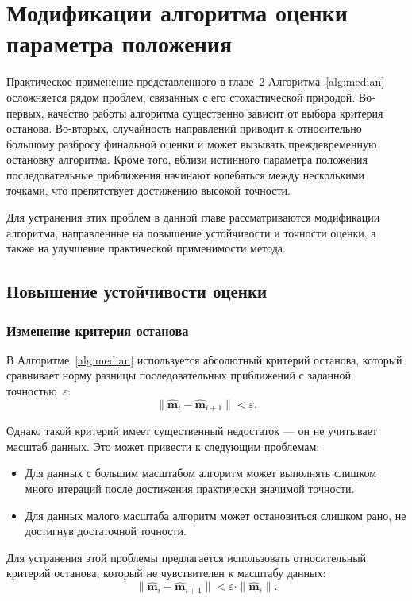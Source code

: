 \chapter{Модификации алгоритма оценки параметра положения}

Практическое применение представленного в главе~2 Алгоритма~\ref{alg:median}  осложняется рядом проблем, связанных с его стохастической природой. Во-первых, качество работы алгоритма существенно зависит от выбора критерия останова. Во-вторых, случайность направлений приводит к относительно большому разбросу финальной оценки и может вызывать преждевременную остановку алгоритма. Кроме того, вблизи истинного параметра положения последовательные приближения начинают колебаться между несколькими точками, что препятствует достижению высокой точности.

Для устранения этих проблем в данной главе рассматриваются модификации алгоритма, направленные на повышение устойчивости и точности оценки, а также на улучшение практической применимости метода.

\section{Повышение устойчивости оценки}

\subsection{Изменение критерия останова}

В Алгоритме~\ref{alg:median} используется абсолютный критерий останова, который сравнивает норму разницы последовательных приближений с заданной точностью~$\varepsilon$: 
\[ \|\widehat{\mathbf{m}}_{{i}}-\widehat{\mathbf{m}}_{{i+1}}\|<\varepsilon.\]

Однако такой критерий имеет существенный недостаток --- он не учитывает масштаб данных. Это может привести к следующим проблемам:

\begin{itemize}
    \item Для данных с большим масштабом алгоритм может выполнять слишком много итераций после достижения практически значимой точности.
    \item Для данных малого масштаба алгоритм может остановиться слишком рано, не достигнув достаточной точности.
\end{itemize}

Для устранения этой проблемы предлагается использовать относительный критерий останова, который не чувствителен к масштабу данных:
\[ \|\widehat{\mathbf{m}}_{{i}}-\widehat{\mathbf{m}}_{{i+1}}\|<\varepsilon \cdot \|\widehat{\mathbf{m}}_{{i}}\|.\]

